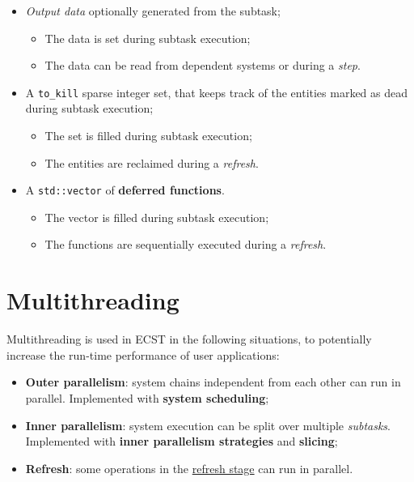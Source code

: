 \documentclass[twoside, 12pt, a4paper, openany]{book}
\begin{document}
\begin{itemize}
\item
  \emph{Output data} optionally generated from the subtask;

  \begin{itemize}
  \item
    The data is set during subtask execution;
  \item
    The data can be read from dependent systems or during a \emph{step}.
  \end{itemize}
\item
  A
  \texttt{to_kill}
  sparse integer set, that keeps track of the entities marked as dead
  during subtask execution;

  \begin{itemize}
  \item
    The set is filled during subtask execution;
  \item
    The entities are reclaimed during a \emph{refresh}.
  \end{itemize}
\item
  A
  \texttt{std::vector}
  of \textbf{deferred functions}.

  \begin{itemize}
  \item
    The vector is filled during subtask execution;
  \item
    The functions are sequentially executed during a \emph{refresh}.
  \end{itemize}
\end{itemize}

\chapter{Multithreading}\label{multithreading}

Multithreading is used in ECST in the following situations, to
potentially increase the run-time performance of user applications:

\begin{itemize}
\item
  \textbf{Outer parallelism}: system chains independent from each other
  can run in parallel. Implemented with \textbf{system scheduling};
\item
  \textbf{Inner parallelism}: system execution can be split over
  multiple \emph{subtasks}. Implemented with \textbf{inner parallelism
  strategies} and \textbf{slicing};
\item
  \textbf{Refresh}: some operations in the
  \protect\hyperlink{flow_refresh}{refresh stage} can run in parallel.
\end{itemize}
\end{document}
